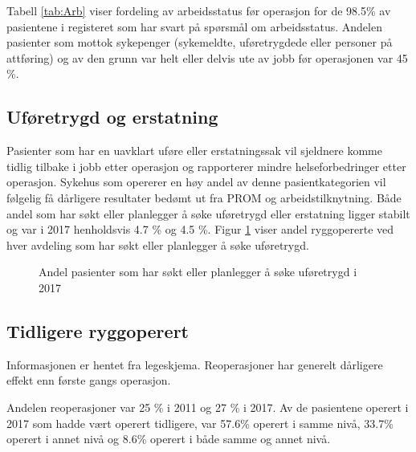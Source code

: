 \documentclass [norsk,a4paper,twoside]{article}\usepackage[]{graphicx}\usepackage[]{color}
\begin{document}
Tabell \ref{tab:Arb} viser fordeling av arbeidsstatus før operasjon for de 98.5\% 
av pasientene i registeret som har svart på spørsmål om arbeidsstatus. 
Andelen pasienter som mottok sykepenger (sykemeldte, uføretrygdede eller personer 
på attføring) og av den grunn var helt eller delvis ute av jobb før operasjonen var 
45 \%. 



\subsection{Uføretrygd og erstatning }




Pasienter som har en uavklart uføre eller erstatningssak vil sjeldnere komme tidlig tilbake i jobb etter operasjon og rapporterer mindre helseforbedringer etter operasjon. Sykehus som opererer en høy andel av denne pasientkategorien vil følgelig få dårligere resultater bedømt ut fra PROM og arbeidstilknytning.
Både andel som har søkt eller planlegger å søke uføretrygd eller erstatning ligger stabilt og var i 2017 
henholdsvis 4.7 \% og 4.5 \%. 
Figur \ref{fig:Ufor} viser andel ryggopererte ved hver avdeling som har søkt eller planlegger å søke uføretrygd.

\begin{figure}[ht]
\caption{\label{fig:Ufor} Andel pasienter som har søkt eller planlegger å søke uføretrygd i 2017} 
\end{figure}


\clearpage

\subsection{Tidligere ryggoperert}
Informasjonen er hentet fra legeskjema.
Reoperasjoner har generelt dårligere effekt enn første gangs operasjon.





Andelen reoperasjoner var 25 \% i 2011 og 27 \% i 2017.
Av de pasientene operert i 2017 som hadde vært operert tidligere, var 57.6\% 
operert i samme nivå, 33.7\% 
operert i annet nivå og 8.6\% 
operert i både samme og annet nivå.
\end{document}
